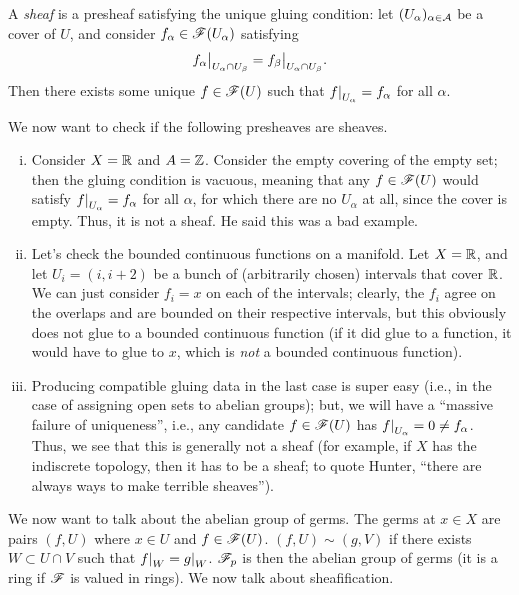 \begin{definition} \label{defn:sheaf}
    A \textit{sheaf} is a presheaf satisfying the unique gluing condition: let $(U_\alpha)_{\alpha \in \mathcal A}$ be a cover of $U$, and consider $f_\alpha \in \mathscr F(U_\alpha)$ satisfying
    \[ \restr{f_\alpha}{U_\alpha \cap U_\beta} = \restr{f_\beta}{U_\alpha \cap U_\beta}. \]
    Then there exists some unique $f \in \mathscr F(U)$ such that $\restr{f}{U_\alpha} = f_\alpha$ for all $\alpha$.
\end{definition}

We now want to check if the following presheaves are sheaves.
\begin{enumerate}[(i)]
    \item Consider $X = \mathbb R$ and $A = \mathbb Z$. Consider the empty covering of the empty set; then the gluing condition is vacuous, meaning that any $f \in \mathscr F(U)$ would satisfy $\restr{f}{U_\alpha} = f_\alpha$ for all $\alpha$, for which there are no $U_\alpha$ at all, since the cover is empty. Thus, it is not a sheaf. {\color{crimson} He said this was a bad example.}
    \item Let's check the bounded continuous functions on a manifold. Let $X = \mathbb R$, and let $U_i = (i, i + 2)$ be a bunch of (arbitrarily chosen) intervals that cover $\mathbb R$. We can just consider $f_i = x$ on each of the intervals; clearly, the $f_i$ agree on the overlaps and are bounded on their respective intervals, but this obviously does not glue to a bounded continuous function (if it did glue to a function, it would have to glue to $x$, which is \textit{not} a bounded continuous function).

    \newpage
    \item Producing compatible gluing data in the last case is super easy (i.e., in the case of assigning open sets to abelian groups); but, we will have a ``massive failure of uniqueness'', i.e., any candidate $f \in \mathscr F(U)$ has $\restr{f}{U_\alpha} = 0 \neq f_\alpha$. Thus, we see that this is generally not a sheaf (for example, if $X$ has the indiscrete topology, then it has to be a sheaf; to quote Hunter, ``there are always ways to make terrible sheaves'').
\end{enumerate}

We now want to talk about the abelian group of germs. The germs at $x \in X$ are pairs $(f, U)$ where $x \in U$ and $f \in \mathscr F(U)$. $(f, U) \sim (g, V)$ if there exists $W \subset U \cap V$ such that $\restr{f}{W} = \restr{g}{W}$. $\mathscr F_p$ is then the abelian group of germs (it is a ring if $\mathscr F$ is valued in rings). We now talk about sheafification.

